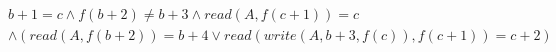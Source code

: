 \begin{align*}
%
& %
b + 1 = c
%
\land
%
f(b + 2)  \neq  b + 3
%
\land
%
\mathit{read}(A,f(c + 1)) = c
~\\~
& %
%
\land
%
(\mathit{read}(A,f(b + 2)) = b + 4 \lor \mathit{read}(\mathit{write}(A,b + 3,f(c)),f(c + 1)) = c + 2)
%
\end{align*}
